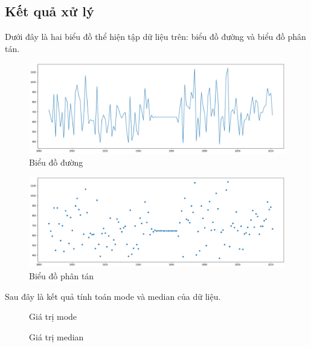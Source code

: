 \documentclass[a4paper]{article}
\begin{document}
\subsection{Kết quả xử lý}
Dưới đây là hai biểu đồ thể hiện tập dữ liệu trên: biểu đồ đường và biểu đồ phân tán.
\begin{center}
\begin{figure}[H]
\includegraphics[scale=0.45]{images/line.png}
\caption{Biểu đồ đường}
\end{figure}

\begin{figure}[H]
\includegraphics[scale=0.45]{images/scatterplot.png}
\caption{Biểu đồ phân tán}
\end{figure}

\end{center}
Sau đây là kết quả tính toán mode và median của dữ liệu.
\begin{center}
\begin{figure}[H]
\caption{Giá trị mode}
\end{figure}

\begin{figure}[H]
\caption{Giá trị median}
\end{figure}
\end{center}
\end{document}
